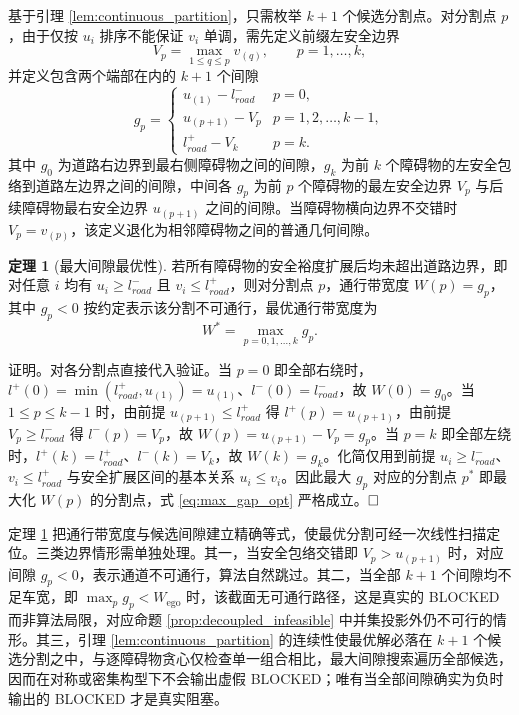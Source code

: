 \documentclass[a4paper,11pt]{ctexart}
\theoremstyle{definition}
\newtheorem{theorem}{定理}[section]
\begin{document}
基于引理 \ref{lem:continuous_partition}，只需枚举 $k+1$ 个候选分割点。对分割点 $p$，由于仅按 $u_i$ 排序不能保证 $v_i$ 单调，需先定义前缀左安全边界
\begin{equation}
    V_p = \max_{1 \leq q \leq p} v_{(q)}, \qquad p = 1, \ldots, k,
    \label{eq:prefix_v}
\end{equation}
并定义包含两个端部在内的 $k+1$ 个间隙
\begin{equation}
    g_p = \begin{cases}
        u_{(1)} - l_{road}^{-} & p = 0, \\[0.3em]
        u_{(p+1)} - V_p & p = 1, 2, \ldots, k-1, \\[0.3em]
        l_{road}^{+} - V_k & p = k.
    \end{cases}
    \label{eq:gap_def}
\end{equation}
其中 $g_0$ 为道路右边界到最右侧障碍物之间的间隙，$g_k$ 为前 $k$ 个障碍物的左安全包络到道路左边界之间的间隙，中间各 $g_p$ 为前 $p$ 个障碍物的最左安全边界 $V_p$ 与后续障碍物最右安全边界 $u_{(p+1)}$ 之间的间隙。当障碍物横向边界不交错时 $V_p = v_{(p)}$，该定义退化为相邻障碍物之间的普通几何间隙。

\begin{theorem}[最大间隙最优性]
\label{thm:max_gap}
若所有障碍物的安全裕度扩展后均未超出道路边界，即对任意 $i$ 均有 $u_i \geq l_{road}^{-}$ 且 $v_i \leq l_{road}^{+}$，则对分割点 $p$，通行带宽度 $W(p) = g_p$，其中 $g_p < 0$ 按约定表示该分割不可通行，最优通行带宽度为
\begin{equation}
    W^{*} = \max_{p = 0, 1, \ldots, k} g_p.
    \label{eq:max_gap_opt}
\end{equation}
\end{theorem}

证明。对各分割点直接代入验证。当 $p = 0$ 即全部右绕时，$l^{+}(0) = \min(l_{road}^{+}, u_{(1)}) = u_{(1)}$、$l^{-}(0) = l_{road}^{-}$，故 $W(0) = g_0$。当 $1 \leq p \leq k-1$ 时，由前提 $u_{(p+1)} \leq l_{road}^{+}$ 得 $l^{+}(p) = u_{(p+1)}$，由前提 $V_p \geq l_{road}^{-}$ 得 $l^{-}(p) = V_p$，故 $W(p) = u_{(p+1)} - V_p = g_p$。当 $p = k$ 即全部左绕时，$l^{+}(k) = l_{road}^{+}$、$l^{-}(k) = V_k$，故 $W(k) = g_k$。化简仅用到前提 $u_i \geq l_{road}^{-}$、$v_i \leq l_{road}^{+}$ 与安全扩展区间的基本关系 $u_i \leq v_i$。因此最大 $g_p$ 对应的分割点 $p^{*}$ 即最大化 $W(p)$ 的分割点，式 \eqref{eq:max_gap_opt} 严格成立。$\hfill\Box$

定理 \ref{thm:max_gap} 把通行带宽度与候选间隙建立精确等式，使最优分割可经一次线性扫描定位。三类边界情形需单独处理。其一，当安全包络交错即 $V_p > u_{(p+1)}$ 时，对应间隙 $g_p < 0$，表示通道不可通行，算法自然跳过。其二，当全部 $k+1$ 个间隙均不足车宽，即 $\max_p g_p < W_{\text{ego}}$ 时，该截面无可通行路径，这是真实的 BLOCKED 而非算法局限，对应命题 \ref{prop:decoupled_infeasible} 中并集投影外仍不可行的情形。其三，引理 \ref{lem:continuous_partition} 的连续性使最优解必落在 $k+1$ 个候选分割之中，与逐障碍物贪心仅检查单一组合相比，最大间隙搜索遍历全部候选，因而在对称或密集构型下不会输出虚假 BLOCKED；唯有当全部间隙确实为负时输出的 BLOCKED 才是真实阻塞。
\end{document}
